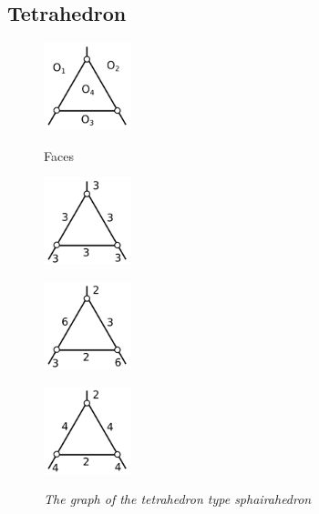 \documentclass[suppldata, dvipdfmx]{interact}
\theoremstyle{plain}%
\theoremstyle{definition}
\theoremstyle{remark}
\theoremstyle{problemstyle}
\begin{document}
\subsection{Tetrahedron}

\begin{figure}[h!tbp]
  \begin{minipage}[t]{0.23\textwidth}
   \centering
   \includegraphics[width=1in, keepaspectratio]{./img/HexahedraWithSphericalFaces/tetrahedron/tetrahedronFaces.png}
   \caption{Faces}
   \label{fig:tetrahedronFaces}
  \end{minipage}
 \hspace*{\fill}
  \begin{minipage}[t]{0.69\textwidth}
  \begin{minipage}[t]{0.23\textwidth}
   \centering
   \includegraphics[width=1in,
   keepaspectratio]{./img/HexahedraWithSphericalFaces/tetrahedron/tetrahedron_a.png}
   \subcaption{}
   \label{fig:}
  \end{minipage}
  \hspace*{\fill}
  \begin{minipage}[t]{0.23\textwidth}
   \centering
   \includegraphics[width=1in, keepaspectratio]{./img/HexahedraWithSphericalFaces/tetrahedron/tetrahedron_b.png}
   \subcaption{}
   \label{}
  \end{minipage}
 \hspace*{\fill}
  \begin{minipage}[t]{0.23\textwidth}
   \centering
   \includegraphics[width=1in, keepaspectratio]{./img/HexahedraWithSphericalFaces/tetrahedron/tetrahedron_c.png}
   \subcaption{}
   \label{fig:}
  \end{minipage}
 \hspace*{\fill}
 \caption{\textit{The graph of the tetrahedron type sphairahedron}}
 \label{fig:tetrahedronCombinations}
  \end{minipage}
\end{figure}
\end{document}
